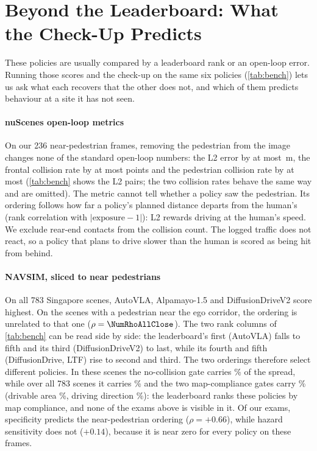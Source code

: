 \section{Beyond the Leaderboard: What the Check-Up Predicts}
\label{sec:bench}



These policies are usually compared by a leaderboard rank or an open-loop error. Running those scores
and the check-up on the same six policies (\cref{tab:bench}) lets us ask what each recovers that the
other does not, and which of them predicts behaviour at a site it has not seen.

\paragraph{nuScenes open-loop metrics}
On our 236 near-pedestrian frames, removing the pedestrian from the image changes none of the standard
open-loop numbers: the L2 error by at most \NumMaxdLtwo\,m, the frontal collision rate by at most
\NumMaxdCol{} points and the pedestrian collision rate by at most \NumMaxdPed{} (\cref{tab:bench}
shows the L2 pairs; the two collision rates behave the same way and are omitted). The metric cannot tell whether a policy saw the pedestrian. Its ordering follows how
far a policy's planned distance departs from the human's (rank correlation \NumRhoLtwoExp{} with
$|\text{exposure}-1|$): L2 rewards driving at the human's speed. We exclude rear-end contacts from the
collision count. The logged traffic does not react, so a policy that plans to drive slower than the
human is scored as being hit from behind.

\paragraph{NAVSIM, sliced to near pedestrians}
On all 783 Singapore scenes, AutoVLA, Alpamayo-1.5 and DiffusionDriveV2 score highest. On the
\NumNclose{} scenes with a pedestrian near the ego corridor, the ordering is unrelated to that one
($\rho=\NumRhoAllClose$). The two rank columns of \cref{tab:bench} can be read side by side: the
leaderboard's first (AutoVLA) falls to fifth and its third (DiffusionDriveV2) to last, while its
fourth and fifth (DiffusionDrive, LTF) rise to second and third. The two orderings therefore select
different policies.
In these scenes the no-collision gate carries \NumNCshareClose\% of the spread, while over all 783
scenes it carries \NumNCshare\% and the two map-compliance gates carry \NumMapShare\% (drivable area
\NumDacShare\%, driving direction \NumDdcShare\%): the leaderboard ranks these policies by map
compliance, and none of the exams above is visible in it. Of our exams, specificity predicts the
near-pedestrian ordering ($\rho=+0.66$), while hazard sensitivity does not ($+0.14$), because it is near zero for every policy on these frames.

